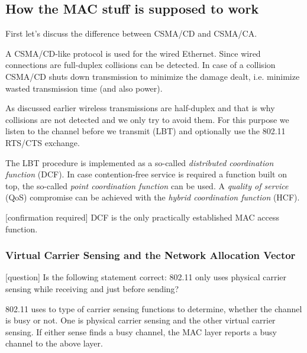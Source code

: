 \documentclass{article}
\begin{document}
	\subsection{How the MAC stuff is supposed to work}
	
	First let's discuss the difference between CSMA/CD and CSMA/CA.
	
	\medskip
	
	A CSMA/CD-like protocol is used for the wired Ethernet. Since wired connections are full-duplex collisions can be detected. In case of a collision CSMA/CD shuts down transmission to minimize the damage dealt, i.e. minimize wasted transmission time (and also power). 
	
	\medskip
	
	As discussed earlier wireless transmissions are half-duplex and that is why collisions are not detected and we only try to avoid them. For this purpose we listen to the channel before we transmit (LBT) and optionally use the 802.11 RTS/CTS exchange.
	
	\medskip
	
	The LBT procedure is implemented as a so-called \emph{distributed coordination function} (DCF). In case contention-free service is required a function built on top, the so-called \emph{point coordination function} can be used. A \emph{quality of service} (QoS) compromise can be achieved with the \emph{hybrid coordination function} (HCF).
	
	\medskip
	
	\color{blue}
	[confirmation required] DCF is the only practically established MAC access function.
	\color{black}
	
	\subsubsection{Virtual Carrier Sensing and the Network Allocation Vector}
	
	\color{blue}
	[question] Is the following statement correct: 802.11 only uses physical carrier sensing while receiving and just before sending?
	\color{black}
	
	\bigskip
	
	802.11 uses to type of carrier sensing functions to determine, whether the channel is busy or not. One is physical carrier sensing and the other virtual carrier sensing. If either sense finds a busy channel, the MAC layer reports a busy channel to the above layer.
	
	\bigskip
	
\end{document}

